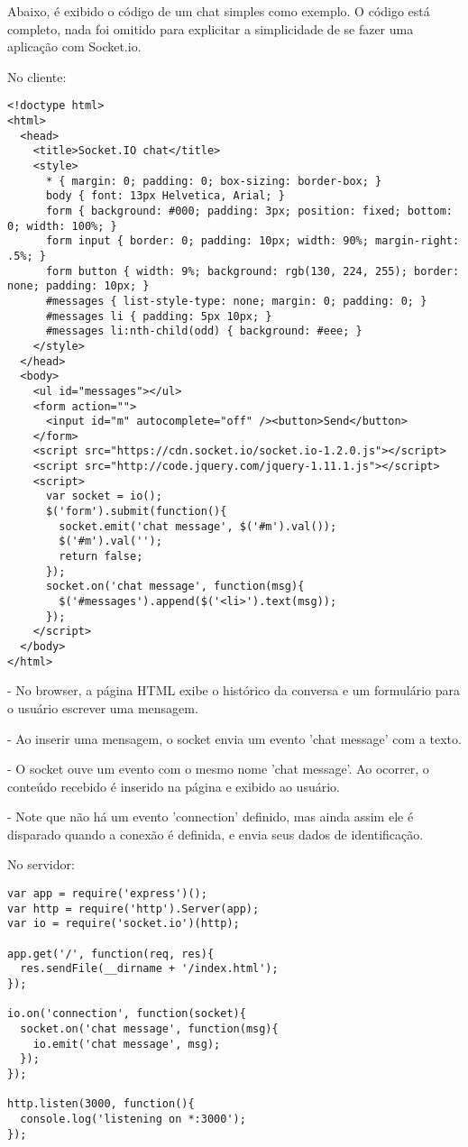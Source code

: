 \documentclass[a4paper,12pt]{article}
\begin{document}
Abaixo, é exibido o código de um chat simples como exemplo. O código está completo, nada foi omitido para explicitar a simplicidade de se fazer uma aplicação com Socket.io.


No cliente:
\begin{small}
\begin{Verbatim}[frame=single]
<!doctype html>
<html>
  <head>
    <title>Socket.IO chat</title>
    <style>
      * { margin: 0; padding: 0; box-sizing: border-box; }
      body { font: 13px Helvetica, Arial; }
      form { background: #000; padding: 3px; position: fixed; bottom: 0; width: 100%; }
      form input { border: 0; padding: 10px; width: 90%; margin-right: .5%; }
      form button { width: 9%; background: rgb(130, 224, 255); border: none; padding: 10px; }
      #messages { list-style-type: none; margin: 0; padding: 0; }
      #messages li { padding: 5px 10px; }
      #messages li:nth-child(odd) { background: #eee; }
    </style>
  </head>
  <body>
    <ul id="messages"></ul>
    <form action="">
      <input id="m" autocomplete="off" /><button>Send</button>
    </form>
    <script src="https://cdn.socket.io/socket.io-1.2.0.js"></script>
    <script src="http://code.jquery.com/jquery-1.11.1.js"></script>
    <script>
      var socket = io();
      $('form').submit(function(){
        socket.emit('chat message', $('#m').val());
        $('#m').val('');
        return false;
      });
      socket.on('chat message', function(msg){
        $('#messages').append($('<li>').text(msg));
      });
    </script>
  </body>
</html>
\end{Verbatim}
\end{small}

- No browser, a página HTML exibe o histórico da conversa e um formulário para o usuário escrever uma mensagem.

- Ao inserir uma mensagem, o socket envia um evento 'chat message' com a texto.

- O socket ouve um evento com o mesmo nome 'chat message'. Ao ocorrer, o conteúdo recebido é inserido na página e exibido ao usuário.

- Note que não há um evento 'connection' definido, mas ainda assim ele é disparado quando a conexão é definida, e envia seus dados de identificação.


No servidor:

\begin{small}
\begin{Verbatim}[frame=single]
var app = require('express')();
var http = require('http').Server(app);
var io = require('socket.io')(http);

app.get('/', function(req, res){
  res.sendFile(__dirname + '/index.html');
});

io.on('connection', function(socket){
  socket.on('chat message', function(msg){
    io.emit('chat message', msg);
  });
});

http.listen(3000, function(){
  console.log('listening on *:3000');
});
\end{Verbatim}
\end{small}
\end{document}
